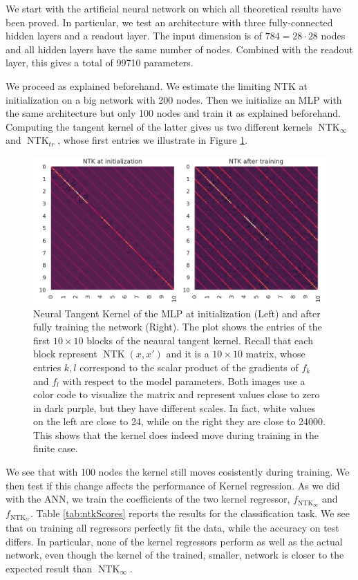 \documentclass[11pt,notitlepage]{article}
\numberwithin{equation}{section}
\DeclareMathOperator{\NTK}{NTK}
\theoremstyle{remark}
\theoremstyle{definition}
\begin{document}
	We start with the artificial neural network on which all theoretical results have been proved.
	In particular, we test an architecture with three fully-connected hidden layers and a readout layer.
	The input dimension is of $784 = 28 \cdot 28$ nodes and all hidden layers have the same number of nodes.
	Combined with the readout layer, this gives a total of 99710 parameters.
	
	We proceed as explained beforehand.
	We estimate the limiting NTK at initialization on a big network with 200 nodes.
	Then we initialize an MLP with the same architecture but only 100 nodes and train it as explained beforehand.
	Computing the tangent kernel of the latter gives us two different kernels $\NTK_\infty$ and $\NTK_{tr}$, whose first entries we illustrate in Figure \ref{fig:ntk_before_after_tr}.
	\begin{figure}
	\includegraphics[width=\linewidth]{../Simulations/figures/ntk_before_after_tr.png}
	\caption{Neural Tangent Kernel of the MLP at initialization (Left) and after fully training the network (Right).
	The plot shows the entries of the first $10 \times 10$ blocks of the neaural tangent kernel.
	Recall that each block represent $\NTK(x, x')$ and it is a $10 \times 10$ matrix, whose entries $k,l$ correspond to the scalar product of the gradients of $f_k$ and $f_l$ with respect to the model parameters. 
	Both images use a color code to visualize the matrix and represent values close to zero in dark purple, but they have different scales.
	In fact, white values on the left are close to 24, while on the right they are close to 24000.
    This shows that the kernel does indeed move during training in the finite case.}
		\label{fig:ntk_before_after_tr}		
	\end{figure}

    We see that with 100 nodes the kernel still moves cosistently during training.
    We then test if this change affects the performance of Kernel regression.
    As we did with the ANN, we train the coefficients of the two kernel regressor, $f_{\NTK_\infty}$ and $f_{\NTK_{tr}}$.
    Table \ref{tab:ntkScores} reports the results for the classification task.
    We see that on training all regressors perfectly fit the data, while the accuracy on test differs.
    In particular, none of the kernel regressors perform as well as the actual network, even though the kernel of the trained, smaller, network is closer to the expected result than $\NTK_\infty$.
	
\end{document}
